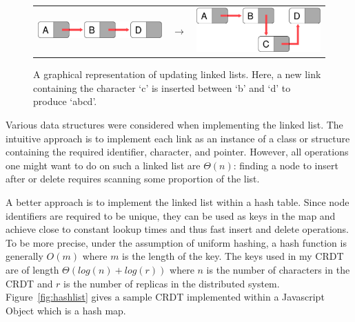 \documentclass[12pt,a4paper,twoside,openright]{report}
\begin{document}
		
		\begin{figure}[htb]
		\centering
		  \begin{tabular}{ >{\centering}m{6cm} >{\centering}m{15mm} >{\centering\arraybackslash}m{6cm} }
		    \includegraphics[width=1\linewidth]{figs/linkedlist_0.eps}  &
		    $\longrightarrow$  &
		    \includegraphics[width=1\linewidth]{figs/linkedlist.eps}
		  \end{tabular}
		\caption[Updating linked lists]{A graphical representation of updating linked lists. Here, a new link containing the character `c' is inserted between `b' and `d' to produce `abcd'.}
		\label{fig:linkedlist}
		\end{figure}
		
		Various data structures were considered when implementing the linked list. The intuitive approach is to implement each link as an instance of a class or structure containing the required identifier, character, and pointer. However, all operations one might want to do on such a linked list are $\Theta (n)$: finding a node to insert after or delete requires scanning some proportion of the list.
		
		A better approach is to implement the linked list within a hash table. Since node identifiers are required to be unique, they can be used as keys in the map and achieve close to constant lookup times and thus fast insert and delete operations. To be more precise, under the assumption of uniform hashing, a hash function is generally $O(m)$ where $m$ is the length of the key. The keys used in my CRDT are of length $\Theta (log(n)+log(r))$ where $n$ is the number of characters in the CRDT and $r$ is the number of replicas in the distributed system. Figure~\ref{fig:hashlist} gives a sample CRDT implemented within a Javascript Object which is a hash map.
		
		
		
\end{document}
